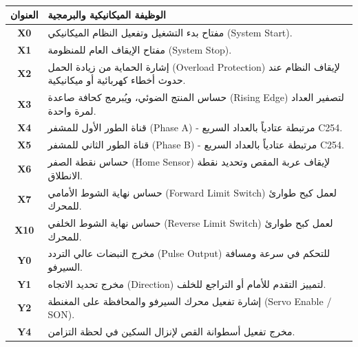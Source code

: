 \documentclass[12pt,a4paper,fleqn]{report}
\begin{document}
\begin{table}[h!]
\centering
\renewcommand{\arraystretch}{1.5}
\begin{tabular}{|c|p{11cm}|}
\hline
\textbf{العنوان} & \textbf{الوظيفة الميكانيكية والبرمجية} \\
\hline
\textbf{X0} & مفتاح بدء التشغيل وتفعيل النظام الميكانيكي \textenglish{(System Start)}. \\
\hline
\textbf{X1} & مفتاح الإيقاف العام للمنظومة \textenglish{(System Stop)}. \\
\hline
\textbf{X2} & إشارة الحماية من زيادة الحمل \textenglish{(Overload Protection)} لإيقاف النظام عند حدوث أخطاء كهربائية أو ميكانيكية. \\
\hline
\textbf{X3} & حساس المنتج الضوئي، ويُبرمج كحافة صاعدة \textenglish{(Rising Edge)} لتصفير العداد لمرة واحدة. \\
\hline
\textbf{X4} & قناة الطور الأول للمشفر \textenglish{(Phase A)} - مرتبطة عتادياً بالعداد السريع \textenglish{C254}. \\
\hline
\textbf{X5} & قناة الطور الثاني للمشفر \textenglish{(Phase B)} - مرتبطة عتادياً بالعداد السريع \textenglish{C254}. \\
\hline
\textbf{X6} & حساس نقطة الصفر \textenglish{(Home Sensor)} لإيقاف عربة المقص وتحديد نقطة الانطلاق. \\
\hline
\textbf{X7} & حساس نهاية الشوط الأمامي \textenglish{(Forward Limit Switch)} لعمل كبح طوارئ للمحرك. \\
\hline
\textbf{X10} & حساس نهاية الشوط الخلفي \textenglish{(Reverse Limit Switch)} لعمل كبح طوارئ للمحرك. \\
\hline
\textbf{Y0} & مخرج النبضات عالي التردد \textenglish{(Pulse Output)} للتحكم في سرعة ومسافة السيرفو. \\
\hline
\textbf{Y1} & مخرج تحديد الاتجاه \textenglish{(Direction)} لتمييز التقدم للأمام أو التراجع للخلف. \\
\hline
\textbf{Y2} & إشارة تفعيل محرك السيرفو والمحافظة على المغنطة \textenglish{(Servo Enable / SON)}. \\
\hline
\textbf{Y4} & مخرج تفعيل أسطوانة القص لإنزال السكين في لحظة التزامن. \\
\hline
\end{tabular}
\caption{}
\label{tab:io_mapping}
\end{table}
\end{document}
